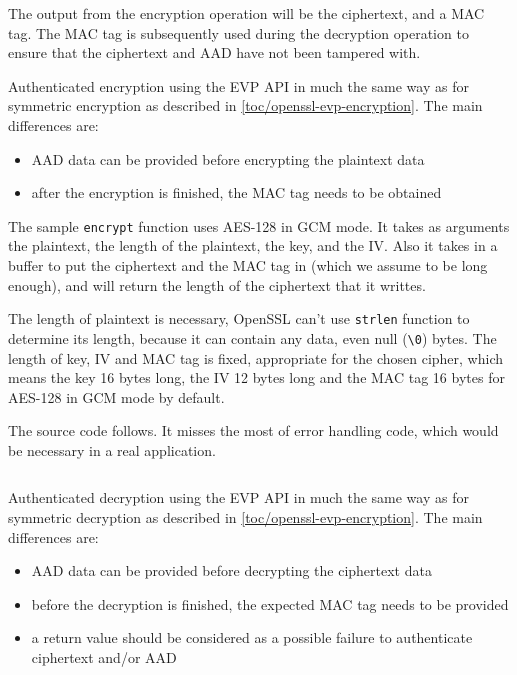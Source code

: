 The output from the encryption operation will be the ciphertext, and a MAC tag. The MAC tag is subsequently used during the decryption operation to ensure that the ciphertext and AAD have not been tampered with.

Authenticated encryption using the EVP API in much the same way as for symmetric encryption as described in \autoref{toc/openssl-evp-encryption}. The main differences are:

\begin{itemize}
  \item AAD data can be provided before encrypting the plaintext data
  \item after the encryption is finished, the MAC tag needs to be obtained
\end{itemize}

The sample \texttt{encrypt} function uses AES-128 in GCM mode. It takes as arguments the plaintext, the length of the plaintext, the key, and the IV. Also it takes in a buffer to put the ciphertext and the MAC tag in (which we assume to be long enough), and will return the length of the ciphertext that it writtes.

The length of plaintext is necessary, OpenSSL can't use \texttt{strlen} function to determine its length, because it can contain any data, even null (\texttt{\textbackslash0}) bytes. The length of key, IV and MAC tag is fixed, appropriate for the chosen cipher, which means the key 16 bytes long, the IV 12 bytes long and the MAC tag 16 bytes for AES-128 in GCM mode by default.

The source code follows. It misses the most of error handling code, which would be necessary in a real application.

\inputminted{c}{code/openssl-evp-aead-encrypt.c}

Authenticated decryption using the EVP API in much the same way as for symmetric decryption as described in \autoref{toc/openssl-evp-encryption}. The main differences are:

\begin{itemize}
  \item AAD data can be provided before decrypting the ciphertext data
  \item before the decryption is finished, the expected MAC tag needs to be provided
  \item a return value should be considered as a possible failure to authenticate ciphertext and/or AAD
\end{itemize}

